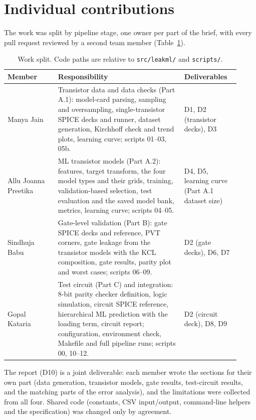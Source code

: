 
\clearpage
\section{Individual contributions}\label{sec:contributions}

The work was split by pipeline stage, one owner per part of the brief, with every pull request
reviewed by a second team member (Table~\ref{tab:contrib}).

\begin{table}[H]
  \centering
  \small
  \caption{Work split. Code paths are relative to \texttt{src/leakml/} and \texttt{scripts/}.}
  \label{tab:contrib}
  \begin{tabular}{@{}>{\raggedright\arraybackslash}p{0.2\linewidth}
                  >{\raggedright\arraybackslash}p{0.5\linewidth}
                  >{\raggedright\arraybackslash}p{0.22\linewidth}@{}}
    \toprule
    Member & Responsibility & Deliverables \\
    \midrule
    Manya Jain \newline 2024102068 &
      Transistor data and data checks (Part A.1): model-card parsing, sampling and
      oversampling, single-transistor SPICE decks and runner, dataset generation, Kirchhoff
      check and trend plots, learning curve; scripts 01--03, 05b. &
      D1, D2 (transistor decks), D3 \\
    \addlinespace
    Allu Joanna Preetika \newline 2024112008 &
      ML transistor models (Part A.2): features, target transform, the four model types and
      their grids, training, validation-based selection, test evaluation and the saved
      model bank, metrics, learning curve; scripts 04--05. &
      D4, D5, learning curve (Part A.1 dataset size) \\
    \addlinespace
    Sindhuja Babu \newline 2024102055 &
      Gate-level validation (Part B): gate SPICE decks and reference, PVT corners, gate
      leakage from the transistor models with the KCL composition, gate results, parity plot
      and worst cases; scripts 06--09. &
      D2 (gate decks), D6, D7 \\
    \addlinespace
    Gopal Kataria \newline 2023112006 &
      Test circuit (Part C) and integration: 8-bit parity checker definition, logic
      simulation, circuit SPICE reference, hierarchical ML prediction with the loading
      term, circuit report; configuration, environment check, Makefile and full pipeline
      runs; scripts 00, 10--12. &
      D2 (circuit deck), D8, D9 \\
    \bottomrule
  \end{tabular}
\end{table}

The report (D10) is a joint deliverable: each member wrote the sections for their own part (data generation, transistor models,
gate results, test-circuit results, and the matching parts of the error analysis), and the
limitations were collected from all four. Shared code (constants, CSV input/output, command-line
helpers and the specification) was changed only by agreement.
